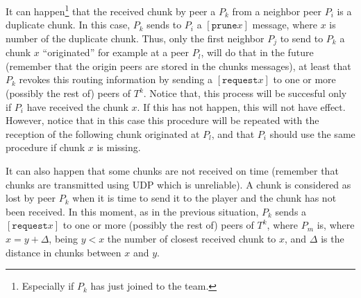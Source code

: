 \label{sec:chunk_routing}
It can happen\footnote{Especially if $P_k$ has just joined to the
  team.} that the received chunk by peer a $P_k$ from a neighbor peer
$P_i$ is a duplicate chunk. In this case, $P_k$ sends to $P_i$ a
$[\mathtt{prune} x]$ message, where $x$ is number of the duplicate
chunk. Thus, only the first neighbor $P_j$ to send to $P_k$ a chunk
$x$ ``originated'' for example at a peer $P_l$, will do that in the
future (remember that the origin peers are stored in the chunks
messages), at least that $P_k$ revokes this routing information by
sending a $[\mathtt{request} x]$ to one or more (possibly the rest of)
peers of $T^k$. Notice that, this process will be succesful only if
$P_i$ have received the chunk $x$. If this has not happen, this will
not have effect. However, notice that in this case this procedure will
be repeated with the reception of the following chunk originated at
$P_l$, and that $P_i$ should use the same procedure if chunk $x$ is
missing.

It can also happen that some chunks are not received on time (remember
that chunks are transmitted using UDP which is unreliable). A chunk is
considered as lost by peer $P_k$ when it is time to send it to the
player and the chunk has not been received. In this moment, as in the
previous situation, $P_k$ sends a $[\mathtt{request} x]$ to one or
more (possibly the rest of) peers of $T^k$, where $P_m$ is, where
$x=y+\Delta$, being $y<x$ the number of closest received chunk to $x$,
and $\Delta$ is the distance in chunks between $x$ and $y$.
